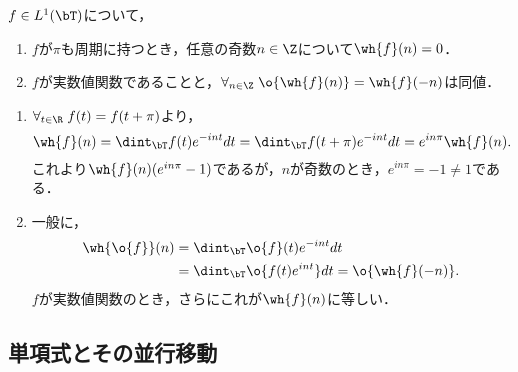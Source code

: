 \documentclass[uplatex,dvipdfmx]{jsreport}
\begin{document}
\begin{proposition}
    $f\in L^1(\bT)$について，
    \begin{enumerate}
        \item $f$が$\pi$も周期に持つとき，任意の奇数$n\in\Z$について$\wh{f}(n)=0$．
        \item $f$が実数値関数であることと，$\forall_{n\in\Z}\;\o{\wh{f}(n)}=\wh{f}(-n)$は同値．
    \end{enumerate}
\end{proposition}
\begin{Proof}\mbox{}
    \begin{enumerate}
        \item $\forall_{t\in\R}\;f(t)=f(t+\pi)$より，
        \[\wh{f}(n)=\dint_\bT f(t)e^{-int}dt=\dint_\bT f(t+\pi)e^{-int}dt=e^{in\pi}\wh{f}(n).\]
        これより$\wh{f}(n)(e^{in\pi}-1)$であるが，$n$が奇数のとき，$e^{in\pi}=-1\ne1$である．
        \item 一般に，
        \begin{align*}
            \wh{\o{f}}(n)&=\dint_\bT\o{f}(t)e^{-int}dt\\
            &=\dint_\bT\o{f(t)e^{int}}dt=\o{\wh{f}(-n)}.
        \end{align*}
        $f$が実数値関数のとき，さらにこれが$\wh{f}(n)$に等しい．
    \end{enumerate}
\end{Proof}

\subsection{単項式とその並行移動}
\end{document}
